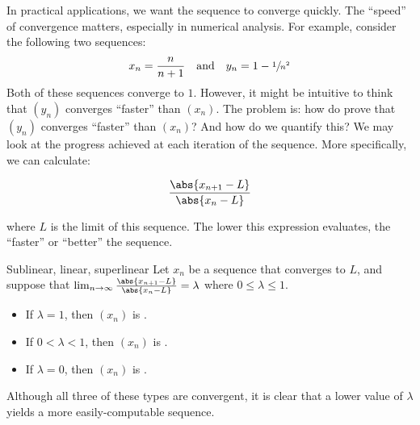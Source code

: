 In practical applications, we want the sequence to converge quickly. The ``speed'' of convergence matters, especially in numerical analysis. For example, consider the following two sequences:
\[ x_n = \frac{n}{n+1} \quad \text{and} \quad y_n = 1 - \sfrac{1}{n^2} \]
Both of these sequences converge to $1$. However, it might be intuitive to think that $(y_n)$ converges ``faster'' than $(x_n)$. The problem is: how do prove that $(y_n)$ converges ``faster'' than $(x_n)$? And how do we quantify this? We may look at the progress achieved at each iteration of the sequence. More specifically, we can calculate:

\[ \frac{\abs{x_{n+1} - L}}{\abs{x_n - L}} \]

where $L$ is the limit of this sequence. The lower this expression evaluates, the ``faster'' or ``better'' the sequence.

\begin{dfnbox}{Sublinear, linear, superlinear}{}
    Let $x_n$ be a sequence that converges to $L$, and suppose that $\lim_{n \to \infty} \frac{\abs{x_{n+1} - L}}{\abs{x_n - L}} = \lambda$ where $0 \leq \lambda \leq 1$.
    \begin{itemize}[noitemsep]
        \item If $\lambda = 1$, then $(x_n)$ is .
        \item If $0 < \lambda < 1$, then $(x_n)$ is .
        \item If $\lambda = 0$, then $(x_n)$ is .
    \end{itemize}
\end{dfnbox}

Although all three of these types are convergent, it is clear that a lower value of $\lambda$ yields a more easily-computable sequence.
